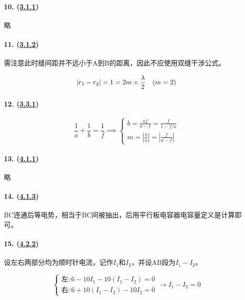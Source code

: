 \paragraph{10. (\hyperref[subsec:3.1.1]{3.1.1})} 略
\paragraph{11. (\hyperref[subsec:3.1.2]{3.1.2})} 需注意此时缝间距并不远小于A到B的距离，因此不应使用双缝干涉公式。

\begin{equation*}
    |r_1-r_2|=1=2m\times\frac\lambda2\quad(m=2)\\
\end{equation*}

\paragraph{12. (\hyperref[subsec:3.3.1]{3.3.1})}

\begin{equation*}
    \frac1a+\frac1b=\frac1f\implies
    \begin{cases}
        b=\frac{af}{a-f}=\frac{f}{1-f/a}\\
        m=\left|\frac{b}{a}\right|=\left|\frac{f}{a-f}\right|
    \end{cases}
\end{equation*}

\paragraph{13. (\hyperref[subsec:4.1.1]{4.1.1})} 略
\paragraph{14. (\hyperref[subsec:4.1.3]{4.1.3})} BC连通后等电势，相当于BC间被抽出，后用平行板电容器电容量定义是计算即可。

\paragraph{15. (\hyperref[subsec:4.2.2]{4.2.2})} 设左右两部分均为顺时针电流，记作$I_1$和$I_2$，并设AB段为$I_1-I_2$。

\begin{equation*}
    \begin{cases}
        \textrm{左}: 6-10I_1-10(I_1-I_2)=0\\
        \textrm{右}: 6+10(I_1-I_2)-10I_2=0
    \end{cases}\to
    I_1-I_2=0
\end{equation*}

